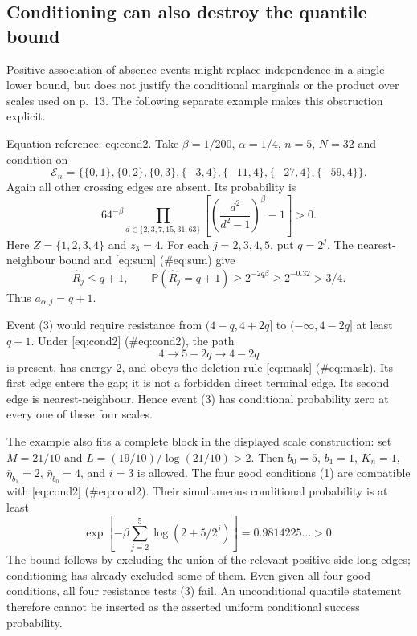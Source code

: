 \documentclass[10pt]{article}
\begin{document}
\subsection*{Conditioning can also destroy the quantile bound}
Positive association of absence events might replace independence in a single lower bound, but does not justify the conditional marginals or the product over scales used on p. 13. The following separate example makes this obstruction explicit.\par
Equation reference: eq:cond2. Take \(\beta=1/200\), \(\alpha=1/4\), \(n=5\), \(N=32\) and condition on \[
 \mathcal E_n=\{\{0,1\},\{0,2\},\{0,3\},\{-3,4\},
              \{-11,4\},\{-27,4\},\{-59,4\}\}.\] Again all other crossing edges are absent. Its probability is \[64^{-\beta}\prod_{d\in\{2,3,7,15,31,63\}}
       \left[\left(\frac{d^2}{d^2-1}\right)^\beta-1\right]>0.\] Here \(Z=\{1,2,3,4\}\) and \(z_3=4\). For each \(j=2,3,4,5\), put \(q=2^j\). The nearest-neighbour bound and [eq:sum] (\#eq:sum) give \[\widehat R_j\le q+1,\qquad
 \mathbb P(\widehat R_j=q+1)\ge2^{-2q\beta}\ge2^{-0.32}>3/4.\] Thus \(a_{\alpha,j}=q+1\).\par
Event (3) would require resistance from \((4-q,4+2q]\) to \((-\infty,4-2q]\) at least \(q+1\). Under [eq:cond2] (\#eq:cond2), the path \[4\longrightarrow 5-2q\longrightarrow4-2q\] is present, has energy 2, and obeys the deletion rule [eq:mask] (\#eq:mask). Its first edge enters the gap; it is not a forbidden direct terminal edge. Its second edge is nearest-neighbour. Hence event (3) has conditional probability zero at every one of these four scales.\par
The example also fits a complete block in the displayed scale construction: set \(M=21/10\) and \(L=(19/10)/\log(21/10)>2\). Then \(b_0=5\), \(b_1=1\), \(K_n=1\), \(\bar\eta_{b_1}=2\), \(\bar\eta_{b_0}=4\), and \(i=3\) is allowed. The four good conditions (1) are compatible with [eq:cond2] (\#eq:cond2). Their simultaneous conditional probability is at least \[\exp\left[-\beta\sum_{j=2}^{5}
                 \log(2+5/2^j)\right]=0.9814225\ldots>0.\] The bound follows by excluding the union of the relevant positive-side long edges; conditioning has already excluded some of them. Even given all four good conditions, all four resistance tests (3) fail. An unconditional quantile statement therefore cannot be inserted as the asserted uniform conditional success probability.\par
\end{document}
